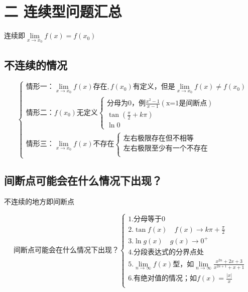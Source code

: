 \documentclass[a4paper,11pt]{book}
\begin{document}
\section*{二  \quad 连续型问题汇总}

连续即$\lim \limits_{x \rightarrow x_{0}}f(x)=f(x_{0})$

\subsection*{不连续的情况}
\[
\text{\ }
\begin{cases}
    \text{情形一：}\lim \limits_{x\rightarrow x_{0}}f(x) \text{存在},f(x_{0})\text{有定义，但是}\lim\limits_{x\rightarrow x_{0}}f(x)\ne f(x_{0})\\
    \text{情形二：}f(x_{0})\text{无定义}
        \begin{cases}
            \text{分母为0，例}\frac{x^{2}-1}{x-1}\left(\text{x=1是间断点}\right)\\
            \tan \left(\frac{\pi}{2}+k \pi \right)\\
            \ln 0
        \end{cases}\\
    \text{情形三：}\lim \limits_{x\rightarrow x_{0}} f(x)不存在
        \begin{cases}
            \text{左右极限存在但不相等}\\
            \text{左右极限至少有一个不存在}\\
        \end{cases}       
\end{cases}
\]

\subsection*{间断点可能会在什么情况下出现？}

不连续的地方即间断点

\[
\text{间断点可能会在什么情况下出现？}
\begin{cases}
    1.\text{分母等于}0\\

    2.\tan f(x) \quad f(x)\rightarrow k \pi + \frac{\pi}{2}\\

    3.\ln g(x) \quad g(x) \rightarrow 0^{+}\\

    4.\text{分段表达式的分界点处}\\

    5.\lim \limits_{n \rightarrow \infty} f(x)\text{型，如}\lim_{n\rightarrow \infty}\frac{x^{2n}+2x+3}{x^{2n+1}+x+1}\\

    6.\text{有绝对值的情况；如}f(x)=\frac{|x|}{x}\\
\end{cases}
\]
\end{document}
